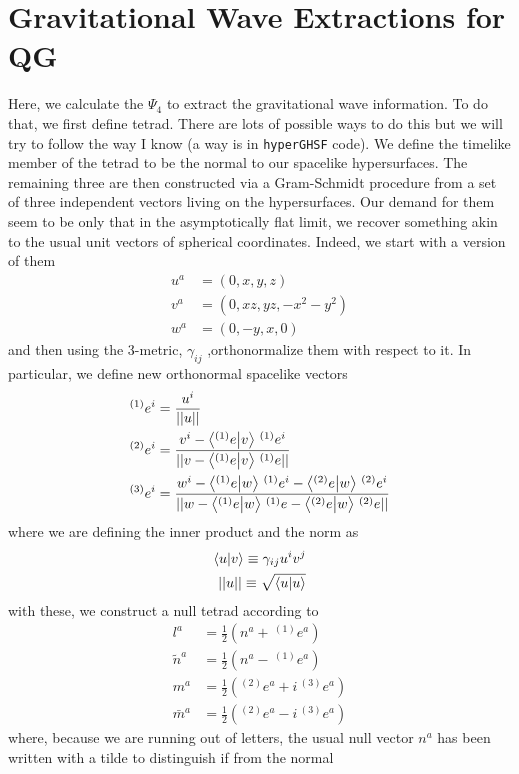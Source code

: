 \documentclass[a4paper,oneside,openany,11pt]{memoir}
\numberwithin{equation}{section} %
\begin{document}
\section{Gravitational Wave Extractions for QG}
Here, we calculate the $\Psi_4$ to extract the gravitational wave information. To do that, we first define tetrad. There are lots of possible ways
to do this but we will try to follow the way I know (a way is in \texttt{hyperGHSF} code). We define the timelike member of the tetrad to be the 
normal to our spacelike hypersurfaces. The remaining three are then constructed via a Gram-Schmidt procedure from a set of three independent
vectors living on the hypersurfaces. Our demand for them seem to be only that in the asymptotically flat limit, we recover something akin to
the usual unit vectors of spherical coordinates. Indeed, we start with a version of them
\begin{align}
u^a &= (0,x,y,z) \\
v^a &= (0,xz,yz,-x^2 - y^2) \\
w^a &= (0,-y,x,0)
\end{align}
and then using the 3-metric, $\gamma_{ij}$ ,orthonormalize them with respect to it. In particular, we define new orthonormal spacelike vectors
\begin{align}
^{(1)}e^i &= \frac{u^i}{||u||} \\
^{(2)}e^i &= \frac{v^i -  \bra{ ^{(1)}e}\ket{v} \, ^{(1)}e^i}{||v -  \bra{ ^{(1)}e}\ket{v} \, ^{(1)}e ||} \\
^{(3)}e^i &= \frac{w^i -  \bra{ ^{(1)}e}\ket{w} \, ^{(1)}e^i -  \bra{ ^{(2)}e}\ket{w} \, ^{(2)}e^i}{||w -  \bra{ ^{(1)}e}\ket{w} \, ^{(1)}e - \bra{ ^{(2)}e}\ket{w} \, ^{(2)}e ||} 
\end{align}
where we are defining the inner product and the norm as
\begin{align}
\bra{u}\ket{v} \equiv \gamma_{ij} u^i v^j \\
|| u || \equiv \sqrt{\bra{u}\ket{u}}
\end{align}
with these, we construct a null tetrad according to
\begin{align}
l^a &= \frac{1}{2} (n^a + \, ^{(1)}e^a) \\
\tilde{n}^a &= \frac{1}{2} (n^a - \, ^{(1)}e^a) \\
m^a &= \frac{1}{2} (^{(2)}e^a + i \, ^{(3)}e^a) \\
\bar{m}^a &=  \frac{1}{2} (^{(2)}e^a - i \, ^{(3)}e^a)
\end{align}
where, because we are running out of letters, the usual null vector $n^a$ has been written with a tilde to distinguish if from the normal 
\end{document}
